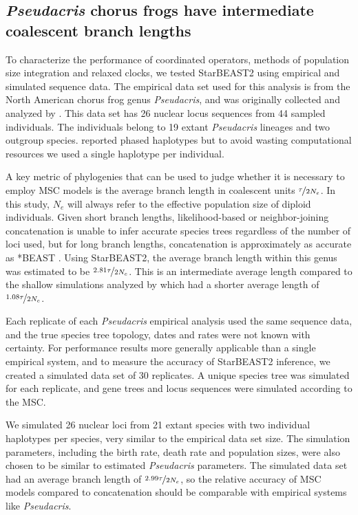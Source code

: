 \documentclass[nogrid]{MBE}%
\begin{document}
\subsection{\textit{Pseudacris} chorus frogs have intermediate coalescent branch lengths}

To characterize the performance of coordinated operators, methods of
population size integration and relaxed clocks, we tested StarBEAST2 using
empirical and simulated sequence data. The empirical data set used for this
analysis is from the North American chorus frog genus \textit{Pseudacris}, and
was originally collected and analyzed by \cite{Barrow201478}. This data set
has 26 nuclear locus sequences from 44 sampled individuals. The individuals
belong to 19 extant \textit{Pseudacris} lineages and two outgroup species.
\cite{Barrow201478} reported phased haplotypes but to avoid wasting
computational resources we used a single haplotype per individual.

A key metric of phylogenies that can be used to judge whether it is necessary
to employ MSC models is the average branch length in coalescent units
$\nicefrac{\tau}{2N_e}$. In this study, $N_e$ will always refer to the
effective population size of diploid individuals. Given short branch lengths,
likelihood-based or neighbor-joining concatenation is unable to infer accurate
species trees regardless of the number of loci used, but for long branch
lengths, concatenation is approximately as accurate as *BEAST
\citep{Ogilvie01052016}. Using StarBEAST2, the average branch length within
this genus was estimated to be $\nicefrac{2.81\tau}{2N_e}$. This is an
intermediate average length compared to the shallow simulations analyzed by
\cite{Ogilvie01052016} which had a shorter average length of
$\nicefrac{1.08\tau}{2N_e}$.

Each replicate of each \textit{Pseudacris} empirical analysis used the same
sequence data, and the true species tree topology, dates and rates were not
known with certainty. For performance results more generally applicable than a
single empirical system, and to measure the accuracy of StarBEAST2 inference,
we created a simulated data set of 30 replicates. A unique species tree was
simulated for each replicate, and gene trees and locus sequences were
simulated according to the MSC.

We simulated 26 nuclear loci from 21 extant species with two individual
haplotypes per species, very similar to the empirical data set size. The
simulation parameters, including the birth rate, death rate and population
sizes, were also chosen to be similar to estimated \textit{Pseudacris}
parameters. The simulated data set had an average branch length of
$\nicefrac{2.99\tau}{2N_e}$, so the relative accuracy of MSC models compared
to concatenation should be comparable with empirical systems like
\textit{Pseudacris}.
\end{document}
